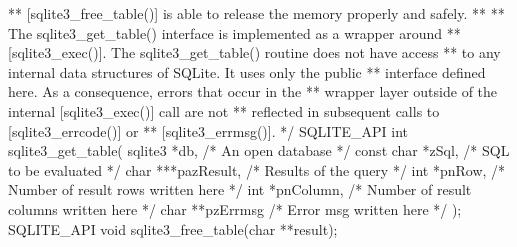 \begin{Codex}[label=sqlite3.h,numbers=left]
{** [sqlite3_free_table()] is able to release the memory properly and safely.
**
** The sqlite3_get_table() interface is implemented as a wrapper around
** [sqlite3_exec()].  The sqlite3_get_table() routine does not have access
** to any internal data structures of SQLite.  It uses only the public
** interface defined here.  As a consequence, errors that occur in the
** wrapper layer outside of the internal [sqlite3_exec()] call are not
** reflected in subsequent calls to [sqlite3_errcode()] or
** [sqlite3_errmsg()].
*/
SQLITE_API int sqlite3_get_table(
  sqlite3 *db,          /* An open database */
  const char *zSql,     /* SQL to be evaluated */
  char ***pazResult,    /* Results of the query */
  int *pnRow,           /* Number of result rows written here */
  int *pnColumn,        /* Number of result columns written here */
  char **pzErrmsg       /* Error msg written here */
);
SQLITE_API void sqlite3_free_table(char **result);

}
\end{Codex}
